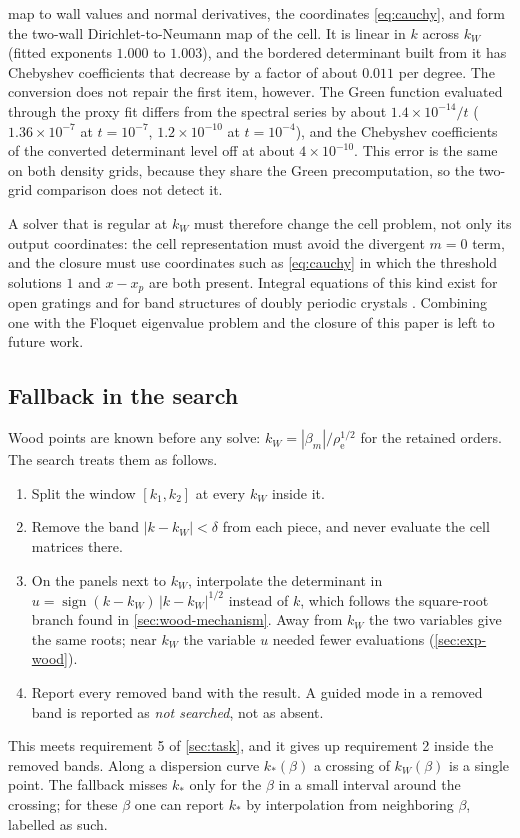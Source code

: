 map to wall values and normal derivatives, the coordinates
\eqref{eq:cauchy}, and form the two-wall Dirichlet-to-Neumann map of the cell.
It is linear in $k$ across $k_W$ (fitted exponents $1.000$ to $1.003$), and
the bordered determinant built from it has Chebyshev coefficients that
decrease by a factor of about $0.011$ per degree. The conversion does not
repair the first item, however. The Green function evaluated through the
proxy fit differs from the spectral series by about $1.4\times10^{-14}/t$
($1.36\times10^{-7}$ at $t=10^{-7}$, $1.2\times10^{-10}$ at $t=10^{-4}$), and the
Chebyshev coefficients of the converted determinant level off at about
$4\times10^{-10}$. This error is the same on both density grids, because they
share the Green precomputation, so the two-grid comparison does not detect
it.

A solver that is regular at $k_W$ must therefore change the cell problem, not
only its output coordinates: the cell representation must avoid the
divergent $m=0$ term, and the closure must use coordinates such as
\eqref{eq:cauchy} in which the threshold solutions $1$ and $x-x_p$ are both
present. Integral equations of this kind exist for open gratings
\cite{BarnettGreengard2011,ChoBarnett2015,BrunoDelourme2014,PerezArancibiaShipmanTurcVenakides2019}
and for band structures of doubly periodic crystals
\cite{BarnettGreengard2010,PerezArancibiaYin2026}. Combining one with the Floquet
eigenvalue problem and the closure of this paper is left to future work.

\subsection{Fallback in the search}\label{sec:wood-fallback}
Wood points are known before any solve: $k_W=|\beta_m|/\rho_{\mathrm e}^{1/2}$ for
the retained orders. The search treats them as follows.
\begin{enumerate}
\item Split the window $[k_1,k_2]$ at every $k_W$ inside it.
\item Remove the band $|k-k_W|<\delta$ from each piece, and never evaluate the
  cell matrices there.
\item On the panels next to $k_W$, interpolate the determinant in
  $u=\operatorname{sign}(k-k_W)\,|k-k_W|^{1/2}$ instead of $k$, which follows the
  square-root branch found in \cref{sec:wood-mechanism}. Away from $k_W$ the two variables give
  the same roots; near $k_W$ the variable $u$ needed fewer evaluations
  (\cref{sec:exp-wood}).
\item Report every removed band with the result. A guided mode in a removed
  band is reported as \emph{not searched}, not as absent.
\end{enumerate}
This meets requirement 5 of \cref{sec:task}, and it gives up requirement 2
inside the removed bands. Along a dispersion curve $k_*(\beta)$ a crossing of
$k_W(\beta)$ is a single point. The fallback misses $k_*$ only for the
$\beta$ in a small interval around the crossing; for these $\beta$ one can
report $k_*$ by interpolation from neighboring $\beta$, labelled as such.

